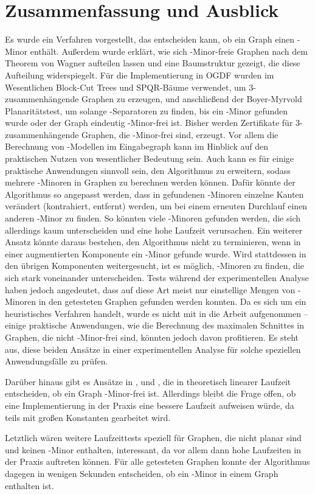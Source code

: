 \chapter{Zusammenfassung und Ausblick}
\label{cha:fazit}

Es wurde ein Verfahren vorgestellt, das entscheiden kann, ob ein Graph einen \kf-Minor enthält.
Außerdem wurde erklärt, wie sich \kf-Minor-freie Graphen nach dem Theorem von Wagner aufteilen lassen und eine Baumstruktur gezeigt, die diese Aufteilung widerspiegelt.
Für die Implementierung in OGDF wurden im Wesentlichen Block-Cut Trees und SPQR-Bäume verwendet, um $3$-zusammenhängende Graphen zu erzeugen, und anschließend der Boyer-Myrvold Planaritätstest, um solange \dd-Separatoren zu finden, bis ein \kf-Minor gefunden wurde oder der Graph eindeutig \kf-Minor-frei ist.
Bisher werden Zertifikate für $3$-zusammenhängende Graphen, die \kf-Minor-frei sind, erzeugt.
Vor allem die Berechnung von \kf-Modellen im Eingabegraph kann im Hinblick auf den praktischen Nutzen von wesentlicher Bedeutung sein.
Auch kann es für einige praktische Anwendungen sinnvoll sein, den Algorithmus zu erweitern, sodass mehrere \kf-Minoren in Graphen zu berechnen werden können.
Dafür könnte der Algorithmus \zB so angepasst werden, dass in gefundenen \kf-Minoren einzelne Kanten verändert (kontrahiert, entfernt) werden, um bei einem erneuten Durchlauf einen anderen \kf-Minor zu finden.
So könnten viele \kf-Minoren gefunden werden, die sich allerdings kaum unterscheiden und eine hohe Laufzeit verursachen.
Ein weiterer Ansatz könnte daraus bestehen, den Algorithmus nicht zu terminieren, wenn in einer augmentierten Komponente ein \kf-Minor gefunde wurde.
Wird stattdessen in den übrigen Komponenten weitergesucht, ist es möglich, \kf-Minoren zu finden, die sich stark voneinander unterscheiden.
Tests während der experimentellen Analyse haben jedoch angedeutet, dass auf diese Art meist nur einstellige Mengen von \kf-Minoren in den getesteten Graphen gefunden werden konnten.
Da es sich um ein heuristisches Verfahren handelt, wurde es nicht mit in die Arbeit aufgenommen -- einige praktische Anwendungen, wie die Berechnung des maximalen Schnittes in Graphen, die nicht \kf-Minor-frei sind, könnten jedoch davon profitieren.
Es steht aus, diese beiden Ansätze in einer experimentellen Analyse für solche speziellen Anwendungsfälle zu prüfen.

Darüber hinaus gibt es Ansätze in \cite{Li11}, \cite{ReL08} und \cite{ReL}, die in theoretisch linearer Laufzeit entscheiden, ob ein Graph \kf-Minor-frei ist.
Allerdings bleibt die Frage offen, ob eine Implementierung in der Praxis eine bessere Laufzeit aufweisen würde, da teils mit großen Konstanten gearbeitet wird.

Letztlich wären weitere Laufzeittests speziell für Graphen, die nicht planar sind und keinen \kf-Minor enthalten, interessant, da vor allem dann hohe Laufzeiten in der Praxis auftreten können.
Für alle getesteten Graphen konnte der Algorithmus dagegen in wenigen Sekunden entscheiden, ob ein \kf-Minor in einem Graph enthalten ist.
